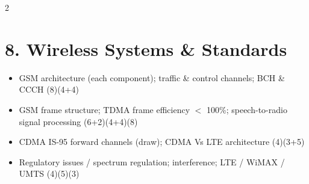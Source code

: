 \documentclass[10pt]{article}
\begin{document}
\begin{multicols}{2}
\section*{8. Wireless Systems \& Standards}
\begin{itemize}
  \item GSM architecture (each component); traffic \& control channels; BCH \& CCCH \hfill (8)(4+4)
  \item GSM frame structure; TDMA frame efficiency $<$ 100\%; speech-to-radio signal processing \hfill (6+2)(4+4)(8)
  \item CDMA IS-95 forward channels (draw); CDMA Vs LTE architecture \hfill (4)(3+5)
  \item Regulatory issues / spectrum regulation; interference; LTE / WiMAX / UMTS \hfill (4)(5)(3)
\end{itemize}

\end{multicols}
\end{document}
